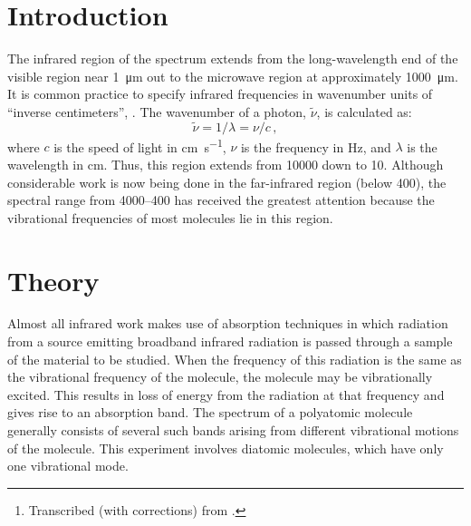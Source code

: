 \maketitle%

\begin{abstract}
\noindent
This experiment is concerned with the rotational fine structure of the infrared vibrational spectrum of a linear molecule such as . By interpreting the details of this spectrum, it is possible to obtain the moment of inertia of the molecule and thus the internuclear separation. In addition, the pure vibrational frequency determines the force constant that is a measure of the bond strength. By also investigating , the isotope effect can be observed.\thanks{Transcribed (with corrections) from \textcite{nibler14}.}
\end{abstract}

\section{Introduction} %
\label{sec:intro}

The infrared region of the spectrum extends from the long-wavelength end of the visible region near \qty{1}{\um} out to the microwave region at approximately \qty{1000}{\um}.
It is common practice to specify infrared frequencies in wavenumber units of ``inverse centimeters'', \unit{\wn}. 
The wavenumber of a photon, \( \widetilde{\nu} \), is calculated as: 
\begin{equation}
  \widetilde{\nu} = 1/\lambda = \nu/c \, ,
\end{equation} 
where \( c \) is the speed of light in \unit{\cm \per \s}, \( \nu \) is the frequency in \unit{\Hz}, and \( \lambda \) is the wavelength in \unit{\cm}.
Thus, this region extends from \qty{10000}{\wn} down to \qty{10}{\wn}. 
Although considerable work is now being done in the far-infrared region (below \qty{400}{\wn}), the spectral range from \SIrange{4000}{400}{\wn} has received the greatest attention because the vibrational frequencies of most molecules lie in this region. 


\section{Theory} %
\label{sec:theory}

Almost all infrared work makes use of absorption techniques in which radiation from a source emitting broadband infrared radiation is passed through a sample of the material to be studied. 
When the frequency of this radiation is the same as the vibrational frequency of the molecule, the molecule may be vibrationally excited.
This results in loss of energy from the radiation at that frequency and gives rise to an absorption band. 
The spectrum of a polyatomic molecule generally consists of several such bands arising from different vibrational motions of the molecule. 
This experiment involves diatomic molecules, which have only one vibrational mode. 

